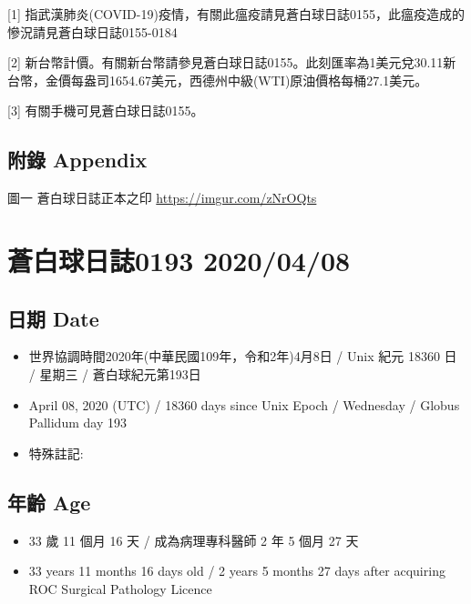 \documentclass[a5paper, 12pt
]{book}
\providecommand{\tightlist}{%
  \setlength{\itemsep}{0pt}\setlength{\parskip}{0pt}}
\begin{document}
{[}1{]}
指武漢肺炎(COVID-19)疫情，有關此瘟疫請見蒼白球日誌0155，此瘟疫造成的慘況請見蒼白球日誌0155-0184

{[}2{]}
新台幣計價。有關新台幣請參見蒼白球日誌0155。此刻匯率為1美元兌30.11新台幣，金價每盎司1654.67美元，西德州中級(WTI)原油價格每桶27.1美元。

{[}3{]} 有關手機可見蒼白球日誌0155。

\hypertarget{ux9644ux9304-appendix-37}{%
\subsection{附錄 Appendix}\label{ux9644ux9304-appendix-37}}

圖一 蒼白球日誌正本之印 \url{https://imgur.com/zNrOQts}

\hypertarget{ux84bcux767dux7403ux65e5ux8a8c0193-20200408}{%
\section{蒼白球日誌0193
2020/04/08}\label{ux84bcux767dux7403ux65e5ux8a8c0193-20200408}}

\hypertarget{ux65e5ux671f-date-38}{%
\subsection{日期 Date}\label{ux65e5ux671f-date-38}}

\begin{itemize}
\tightlist
\item
  世界協調時間2020年(中華民國109年，令和2年)4月8日 / Unix 紀元 18360 日
  / 星期三 / 蒼白球紀元第193日
\item
  April 08, 2020 (UTC) / 18360 days since Unix Epoch / Wednesday /
  Globus Pallidum day 193
\item
  特殊註記:
\end{itemize}

\hypertarget{ux5e74ux9f61-age-38}{%
\subsection{年齡 Age}\label{ux5e74ux9f61-age-38}}

\begin{itemize}
\tightlist
\item
  33 歲 11 個月 16 天 / 成為病理專科醫師 2 年 5 個月 27 天
\item
  33 years 11 months 16 days old / 2 years 5 months 27 days after
  acquiring ROC Surgical Pathology Licence
\end{itemize}
\end{document}
